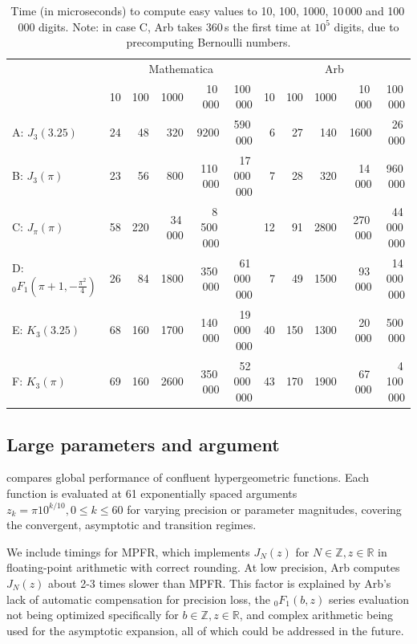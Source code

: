 \documentclass[11pt,a4paper]{article}
\begin{document}
\begin{table}
\renewcommand{\arraystretch}{1.4}
\setlength{\tabcolsep}{.4em}
\begin{center}
\begin{scriptsize}
\begin{tabular}{l | r r r r r | r r r r r}
   &  \multicolumn{5}{|c|}{Mathematica}  &  \multicolumn{5}{|c}{Arb}    \\
  & 10 & 100 & 1000 & 10\,000 & 100\,000 & 10 & 100 & 1000 & 10\,000 & 100\,000 \\ \hline
A: $J_3(3.25)$ &
24 & 48 & 320 & 9200 & 590\,000 &
6 & 27 & 140 & 1600 & 26\,000 \\
B: $J_3(\pi)$ &
23 & 56 & 800 & 110\,000 & 17\,000\,000 &
7 & 28 & 320 & 14\,000 & 960\,000 \\
C: $J_{\pi}(\pi)$ &
58 & 220 & 34\,000 & 8\,500\,000 &  &
12 & 91 & 2800 & 270\,000 & 44\,000\,000 \\
D: ${}_0F_1(\pi\!+\!1,-\tfrac{\pi^2}{4})\!$ &
26 & 84 & 1800 & 350\,000 & 61\,000\,000 &
7 & 49 & 1500 & 93\,000 & 14\,000\,000 \\
E: $K_3(3.25)$ &
68 & 160 & 1700 & 140\,000 & 19\,000\,000 &
40 & 150 & 1300 & 20\,000 & 500\,000 \\
F: $K_3(\pi)$ &
69 & 160 & 2600 & 350\,000 & 52\,000\,000 &
43 & 170 & 1900 & 67\,000 & 4\,100\,000 \\
\end{tabular}
\end{scriptsize}
\caption{Time (in microseconds) to compute easy values to
10, 100, 1000, 10\,000 and 100\,000 digits.
Note: in case C, Arb takes 360\,s the first time at $10^5$ digits, due to
precomputing Bernoulli numbers.}
\label{tab:prectimings}
\end{center}
\end{table}

\subsection{Large parameters and argument}

 compares global performance of
confluent hypergeometric functions.
Each function is evaluated at 61 exponentially spaced arguments
$z_k = \pi 10^{k/10}, 0 \le k \le 60$
for varying precision or parameter magnitudes,
covering the convergent, asymptotic and transition regimes.

We include timings for MPFR, which implements $J_N(z)$ for $N \in \mathbb{Z}, z \in \mathbb{R}$
in floating-point arithmetic with correct rounding.
At low precision, Arb computes $J_N(z)$ about 2-3 times slower than MPFR.
This factor is explained by Arb's lack of automatic compensation for precision loss,
the ${}_0F_1(b,z)$ series evaluation not being optimized specifically for $b \in \mathbb{Z}, z \in \mathbb{R}$,
and complex arithmetic being used for the asymptotic expansion,
all of which could be addressed in the future.
\end{document}
